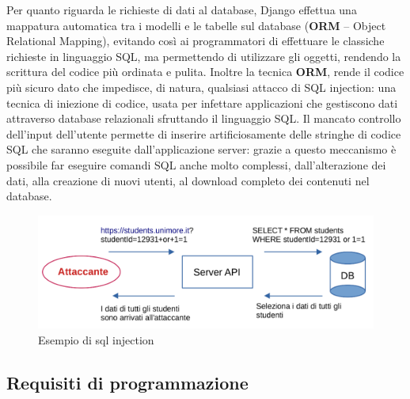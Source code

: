 \documentclass[12pt,a4paper]{article}
\begin{document}
Per quanto riguarda le richieste di dati al database, Django effettua una mappatura automatica tra i modelli e le tabelle sul database (\textbf{ORM} -- Object Relational Mapping), evitando così ai programmatori di effettuare le classiche richieste in linguaggio SQL, ma permettendo di utilizzare gli oggetti, rendendo la scrittura del codice più ordinata e pulita. Inoltre la tecnica \textbf{ORM}, rende il codice più sicuro dato che impedisce, di natura, qualsiasi attacco di SQL injection: una tecnica di iniezione di codice, usata per infettare applicazioni che gestiscono dati attraverso database relazionali sfruttando il linguaggio SQL. Il mancato controllo dell'input dell'utente permette di inserire artificiosamente delle stringhe di codice SQL che saranno eseguite dall'applicazione server: grazie a questo meccanismo è possibile far eseguire comandi SQL anche molto complessi, dall'alterazione dei dati, alla creazione di nuovi utenti, al download completo dei contenuti nel database.
\begin{figure}[H]
    \centering
    \includegraphics[width=1\linewidth]{sql_injection.png}
    \caption{Esempio di sql injection}
\end{figure}
\subsection{Requisiti di programmazione}
\end{document}
